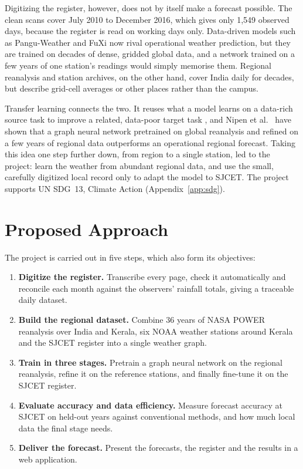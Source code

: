Digitizing the register, however, does not by itself make a forecast possible. The clean scans cover July 2010 to December 2016, which gives only 1,549 observed days, because the register is read on working days only. Data-driven models such as Pangu-Weather \cite{ref5} and FuXi \cite{ref6} now rival operational weather prediction, but they are trained on decades of dense, gridded global data, and a network trained on a few years of one station's readings would simply memorise them. Regional reanalysis and station archives, on the other hand, cover India daily for decades, but describe grid-cell averages or other places rather than the campus.

Transfer learning connects the two. It reuses what a model learns on a data-rich source task to improve a related, data-poor target task \cite{ref8}, and Nipen et al.\ \cite{ref7} have shown that a graph neural network pretrained on global reanalysis and refined on a few years of regional data outperforms an operational regional forecast. Taking this idea one step further down, from region to a single station, led to the project: learn the weather from abundant regional data, and use the small, carefully digitized local record only to adapt the model to SJCET. The project supports UN SDG~13, Climate Action (Appendix~\ref{app:sdg}).

\section{Proposed Approach}
\label{sec:approach}

The project is carried out in five steps, which also form its objectives:

\begin{enumerate}[itemsep=0pt,topsep=4pt]
    \item \textbf{Digitize the register.} Transcribe every page, check it automatically and reconcile each month against the observers' rainfall totals, giving a traceable daily dataset.
    \item \textbf{Build the regional dataset.} Combine 36 years of NASA POWER reanalysis over India and Kerala, six NOAA weather stations around Kerala and the SJCET register into a single weather graph.
    \item \textbf{Train in three stages.} Pretrain a graph neural network on the regional reanalysis, refine it on the reference stations, and finally fine-tune it on the SJCET register.
    \item \textbf{Evaluate accuracy and data efficiency.} Measure forecast accuracy at SJCET on held-out years against conventional methods, and how much local data the final stage needs.
    \item \textbf{Deliver the forecast.} Present the forecasts, the register and the results in a web application.
\end{enumerate}

\renewcommand{\footrulewidth}{0.4pt}
